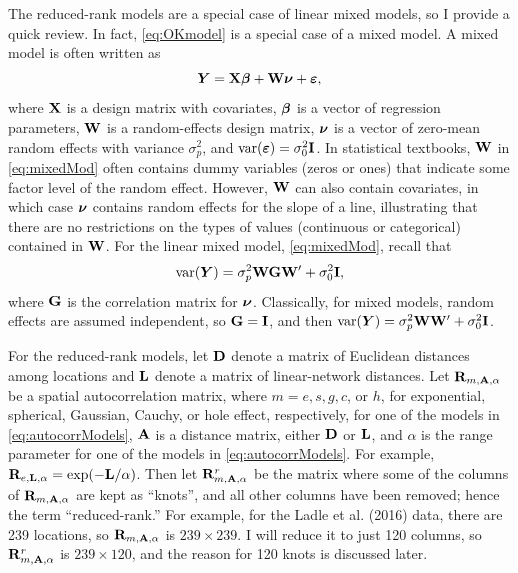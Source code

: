 \documentclass[11pt, titlepage]{article}\usepackage[]{graphicx}\usepackage[]{color}
\begin{document}
\begin{spacing}{1.9}
\begin{flushleft}
The reduced-rank models are a special case of linear mixed models, so I provide a quick review. In fact, \ref{eq:OKmodel} is a special case of a mixed model. A mixed model is often written as
\begin{equation} \label{eq:mixedMod}
    \bm Y = \mathbf{X}{\boldsymbol{\beta}} + \mathbf{W}\mbox{\boldmath $\nu$} + \mbox{\boldmath $\varepsilon$},
\end{equation}
 where $\mathbf{X}$ is a design matrix with covariates, ${\boldsymbol{\beta}}$ is a vector of regression parameters, $\mathbf{W}$ is a random-effects design matrix, $\mbox{\boldmath $\nu$}$ is a vector of zero-mean random effects with variance $\sigma^2_p$, and $\textrm{var}(\mbox{\boldmath $\varepsilon$}) = \sigma^2_0 \mathbf{I}$.  In statistical textbooks, $\mathbf{W}$ in \ref{eq:mixedMod} often contains dummy variables (zeros or ones) that indicate some factor level of the random effect.  However, $\mathbf{W}$ can also contain covariates, in which case $\mbox{\boldmath $\nu$}$ contains random effects for the slope of a line, illustrating that there are no restrictions on the types of values (continuous or categorical) contained in $\mathbf{W}$. For the linear mixed model, \ref{eq:mixedMod}, recall that
 \begin{equation} \label{eq:varMixedMod}
 \textrm{var}(\bm Y) = \sigma^2_p\mathbf{W}\mathbf{G}\mathbf{W}^{\prime} + \sigma^2_0\mathbf{I}, 
 \end{equation}
 where $\mathbf{G}$ is the correlation matrix for $\mbox{\boldmath $\nu$}$.  Classically, for mixed models, random effects are assumed independent, so $\mathbf{G} = \mathbf{I}$, and then $\textrm{var}(\bm Y) = \sigma^2_p\mathbf{W}\mathbf{W}^{\prime} + \sigma^2_0\mathbf{I}$.  

 For the reduced-rank models, let $\mathbf{D}$ denote a matrix of Euclidean distances among locations and $\mathbf{L}$ denote a matrix of linear-network distances. Let $\mathbf{R}_{m,\mathbf{A},\alpha}$ be a spatial autocorrelation matrix, where $m = e, s, g, c$, or $h$, for exponential, spherical, Gaussian, Cauchy, or hole effect, respectively, for one of the models in \ref{eq:autocorrModels}, $\mathbf{A}$ is a distance matrix, either $\mathbf{D}$ or $\mathbf{L}$, and $\alpha$ is the range parameter for one of the models in \ref{eq:autocorrModels}.  For example, $\mathbf{R}_{e,\mathbf{L},\alpha} = \exp(-\mathbf{L}/\alpha)$.  Then let $\mathbf{R}^r_{m,\mathbf{A},\alpha}$ be the matrix where some of the columns of $\mathbf{R}_{m,\mathbf{A},\alpha}$ are kept as ``knots'', and all other columns have been removed; hence the term ``reduced-rank.''  For example, for the Ladle et al. (2016) data, there are 239 locations, so $\mathbf{R}_{m,\mathbf{A},\alpha}$ is $239 \times 239$. I will reduce it to just 120 columns, so $\mathbf{R}^r_{m,\mathbf{A},\alpha}$ is $239 \times 120$, and the reason for 120 knots is discussed later.


\end{flushleft}
\end{spacing}
\end{document}

